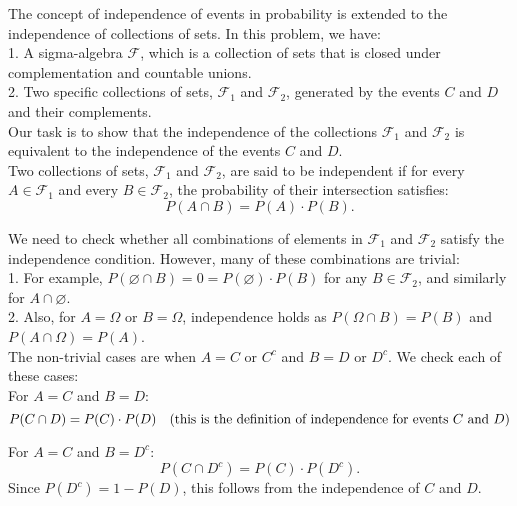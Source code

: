 \begin{solution}
    The concept of independence of events in probability is extended to the independence of collections of sets. In this problem, we have:\\

    1. A sigma-algebra \( \mathcal{F} \), which is a collection of sets that is closed under complementation and countable unions.\\
    2. Two specific collections of sets, \( \mathcal{F}_1 \) and \( \mathcal{F}_2 \), generated by the events \( C \) and \( D \) and their complements.\\

    Our task is to show that the independence of the collections \( \mathcal{F}_1 \) and \( \mathcal{F}_2 \) is equivalent to the independence of the events \( C \) and \( D \).\\

    Two collections of sets, \( \mathcal{F}_1 \) and \( \mathcal{F}_2 \), are said to be independent if for every \( A \in \mathcal{F}_1 \) and every \( B \in \mathcal{F}_2 \), the probability of their intersection satisfies:
   \[
   P(A \cap B) = P(A) \cdot P(B).
   \]

   We need to check whether all combinations of elements in \( \mathcal{F}_1 \) and \( \mathcal{F}_2 \) satisfy the independence condition. However, many of these combinations are trivial:\\
   
   1. For example, \( P(\varnothing \cap B) = 0 = P(\varnothing) \cdot P(B) \) for any \( B \in \mathcal{F}_2 \), and similarly for \( A \cap \varnothing \).\\
   2. Also, for \( A = \Omega \) or \( B = \Omega \), independence holds as \( P(\Omega \cap B) = P(B) \) and \( P(A \cap \Omega) = P(A) \).\\

   The non-trivial cases are when \( A = C \) or \( C^c \) and \( B = D \) or \( D^c \). We check each of these cases:\\

   For \( A = C \) and \( B = D \):
     \[
     P(C \cap D) = P(C) \cdot P(D) \quad \text{(this is the definition of independence for events \( C \) and \( D \))}
     \]
     
   For \( A = C \) and \( B = D^c \):
     \[
     P(C \cap D^c) = P(C) \cdot P(D^c).
     \]
     Since \( P(D^c) = 1 - P(D) \), this follows from the independence of \( C \) and \( D \).\\


\end{solution}
